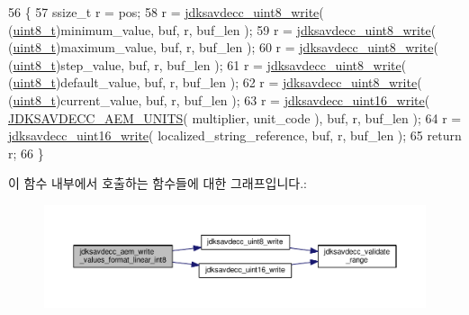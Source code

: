 \begin{DoxyCode}
56 \{
57     ssize\_t r = pos;
58     r = \hyperlink{group__endian_ga76773f9a39ae810aec586d2bb3b617e5}{jdksavdecc\_uint8\_write}( (\hyperlink{stdint_8h_aba7bc1797add20fe3efdf37ced1182c5}{uint8\_t})minimum\_value, buf, r, buf\_len );
59     r = \hyperlink{group__endian_ga76773f9a39ae810aec586d2bb3b617e5}{jdksavdecc\_uint8\_write}( (\hyperlink{stdint_8h_aba7bc1797add20fe3efdf37ced1182c5}{uint8\_t})maximum\_value, buf, r, buf\_len );
60     r = \hyperlink{group__endian_ga76773f9a39ae810aec586d2bb3b617e5}{jdksavdecc\_uint8\_write}( (\hyperlink{stdint_8h_aba7bc1797add20fe3efdf37ced1182c5}{uint8\_t})step\_value, buf, r, buf\_len );
61     r = \hyperlink{group__endian_ga76773f9a39ae810aec586d2bb3b617e5}{jdksavdecc\_uint8\_write}( (\hyperlink{stdint_8h_aba7bc1797add20fe3efdf37ced1182c5}{uint8\_t})default\_value, buf, r, buf\_len );
62     r = \hyperlink{group__endian_ga76773f9a39ae810aec586d2bb3b617e5}{jdksavdecc\_uint8\_write}( (\hyperlink{stdint_8h_aba7bc1797add20fe3efdf37ced1182c5}{uint8\_t})current\_value, buf, r, buf\_len );
63     r = \hyperlink{group__endian_ga4c0851ce17bde5306fdb04bfb5b75af1}{jdksavdecc\_uint16\_write}( \hyperlink{group__aem__descriptor_gae5f7498f6048b4dda1aca923b0eae0f6}{JDKSAVDECC\_AEM\_UNITS}( 
      multiplier, unit\_code ), buf, r, buf\_len );
64     r = \hyperlink{group__endian_ga4c0851ce17bde5306fdb04bfb5b75af1}{jdksavdecc\_uint16\_write}( localized\_string\_reference, buf, r, buf\_len );
65     \textcolor{keywordflow}{return} r;
66 \}
\end{DoxyCode}


이 함수 내부에서 호출하는 함수들에 대한 그래프입니다.\+:
\nopagebreak
\begin{figure}[H]
\begin{center}
\leavevmode
\includegraphics[width=350pt]{group__aem__descriptor_gae98ac239b98af7afc3d0571faa17319d_cgraph}
\end{center}
\end{figure}


